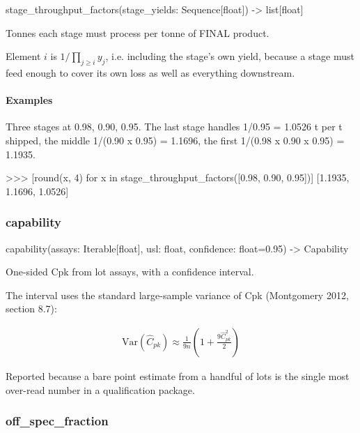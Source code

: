 \documentclass[10pt,a4paper,twoside]{report}
\begin{document}
\begin{verbatimsmall}
stage_throughput_factors(stage_yields: Sequence[float]) -> list[float]
\end{verbatimsmall}

Tonnes each stage must process per tonne of FINAL product.

Element $i$ is $1/\prod_{j \ge i} y_j$, i.e. including the stage's own yield, because a stage must feed enough to cover its own loss as well as everything downstream.

\paragraph*{Examples}

Three stages at 0.98, 0.90, 0.95. The last stage handles 1/0.95 = 1.0526 t per t shipped, the middle 1/(0.90 x 0.95) = 1.1696, the first 1/(0.98 x 0.90 x 0.95) = 1.1935.

\begin{doctestblock}
>>> [round(x, 4) for x in stage_throughput_factors([0.98, 0.90, 0.95])]
[1.1935, 1.1696, 1.0526]
\end{doctestblock}

\subsubsection*{capability}

\begin{verbatimsmall}
capability(assays: Iterable[float], usl: float, confidence: float=0.95) -> Capability
\end{verbatimsmall}

One-sided Cpk from lot assays, with a confidence interval.

The interval uses the standard large-sample variance of Cpk (Montgomery 2012, section 8.7):

\begin{equation*}
\begin{gathered}
\mathrm{Var}(\hat{C}_{pk}) \approx \frac{1}{9n}\left(1 + \frac{9 \hat{C}_{pk}^2}{2}\right)
\end{gathered}
\end{equation*}

Reported because a bare point estimate from a handful of lots is the single most over-read number in a qualification package.

\subsubsection*{off\_spec\_fraction}
\end{document}
